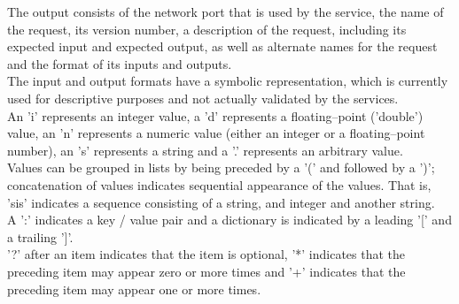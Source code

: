 The output consists of the \yarp{} network port that is used by the service, the name of
the request, its version number, a description of the request, including its expected
input and expected output, as well as alternate names for the request and the format of
its inputs and outputs.\\

The input and output formats have a symbolic representation, which is currently used for
descriptive purposes and not actually validated by the services.\\

An 'i' represents an integer value, a 'd' represents a floating--point ('double') value,
an 'n' represents a numeric value (either an integer or a floating--point number), an 's'
represents a string and a '.' represents an arbitrary value.\\

Values can be grouped in lists by being preceded by a '(' and followed by a ')';
concatenation of values indicates sequential appearance of the values.
That is, 'sis' indicates a sequence consisting of a string, and integer and another
string.\\

A ':' indicates a key / value pair and a dictionary is indicated by a leading '[' and a
trailing ']'.\\

'?' after an item indicates that the item is optional, '*' indicates that the preceding
item may appear zero or more times and '+' indicates that the preceding item may appear
one or more times.\\

